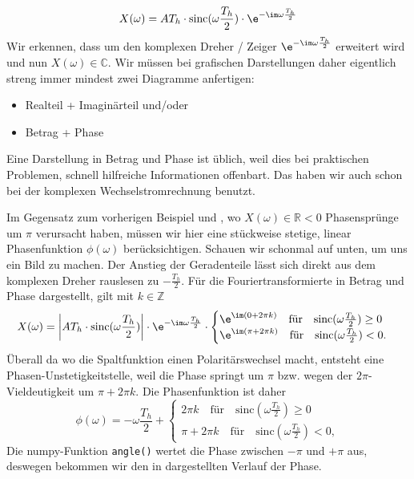 \begin{Loesung}
\begin{equation}
\label{eq:A8A2DEE53A_Loesung}
X(\omega) = A T_h \cdot \mathrm{sinc}(\omega\frac{T_h}{2}) \cdot  \e^{-\im\omega\frac{T_h}{2}}
\end{equation}
%
Wir erkennen, dass  um den komplexen Dreher / Zeiger $\e^{-\im\omega\frac{T_h}{2}}$
erweitert wird und nun $X(\omega)\in\mathbb{C}$.
%
Wir müssen bei grafischen Darstellungen daher eigentlich streng immer mindest
zwei Diagramme anfertigen:
\begin{itemize}
  \item Realteil + Imaginärteil und/oder
  \item Betrag + Phase
\end{itemize}
%
Eine Darstellung in Betrag und Phase ist üblich, weil dies bei praktischen
Problemen, schnell hilfreiche Informationen offenbart. Das haben wir auch schon
bei der komplexen Wechselstromrechnung benutzt.


Im Gegensatz zum vorherigen Beispiel und ,
wo $X(\omega)\in\mathbb{R}<0$ Phasensprünge um $\pi$ verursacht haben, müssen
wir hier eine stückweise stetige, linear Phasenfunktion $\phi(\omega)$ berücksichtigen.
Schauen wir schonmal auf  unten, um uns ein Bild zu machen.
%
Der Anstieg der Geradenteile lässt sich direkt aus dem komplexen Dreher rauslesen
zu $-\frac{T_h}{2}$.
%
Für die Fouriertransformierte in Betrag und Phase dargestellt, gilt mit $k\in\mathbb{Z}$
\begin{equation}
X(\omega) = \bigg|A T_h \cdot \mathrm{sinc}(\omega\frac{T_h}{2})\bigg|
\cdot  \e^{-\im\omega\frac{T_h}{2}}\cdot
\begin{cases}
\e^{\im (0+2\pi k)}\quad \text{für}\quad \mathrm{sinc}(\omega\frac{T_h}{2})\geq0\\
\e^{\im (\pi + 2\pi k)}\quad \text{für}\quad\mathrm{sinc}(\omega\frac{T_h}{2})<0.
\end{cases}
\end{equation}
Überall da wo die Spaltfunktion einen Polaritärswechsel macht, entsteht
eine Phasen-Unstetigkeitstelle, weil die Phase springt um $\pi$ bzw. wegen der
$2\pi$-Vieldeutigkeit um $\pi + 2\pi k$.
%
Die Phasenfunktion ist daher
\begin{equation}
\phi(\omega) = -\omega\frac{T_h}{2} +
\begin{cases}
2\pi k\quad \text{für}\quad \mathrm{sinc}(\omega\frac{T_h}{2})\geq0\\
\pi + 2\pi k\quad \text{für}\quad\mathrm{sinc}(\omega\frac{T_h}{2})<0,
\end{cases}
\end{equation}
Die numpy-Funktion \verb|angle()| wertet die Phase zwischen $-\pi$ und $+\pi$ aus,
deswegen bekommen wir den in  dargestellten Verlauf der Phase.


\end{Loesung}
